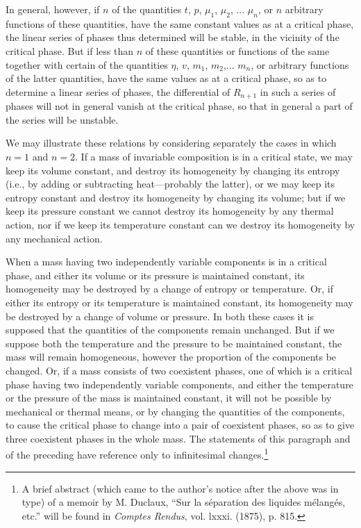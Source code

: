 \documentclass[12pt]{memoir}
\begin{document}
In general, however, if $n$ of the quantities $t$, $p$, $\mu_1$, $\mu_2$, ... $\mu_n$, or $n$ arbitrary functions of these quantities, have the same constant values as at a critical phase, the linear series of phases thus determined will be stable, in the vicinity of the critical phase. But if less than $n$ of these quantities or functions of the same together with certain of the quantities $\eta$, $v$, $m_1$, $m_2$,... $m_n$, or arbitrary functions of the latter quantities, have the same values as at a critical phase, so as to determine a linear series of phases, the differential of $R_{n+1}$ in such a series of phases will not in general vanish at the critical phase, so that in general a part of the series will be unstable.


We may illustrate these relations by considering separately the cases in which $n = 1$ and $n = 2$. If a mass of invariable composition is in a critical state, we may keep its volume constant, and destroy its homogeneity by changing its entropy (i.e., by adding or subtracting heat---probably the latter), or we may keep its entropy constant and destroy its homogeneity by changing its volume; but if we keep its pressure constant we cannot destroy its homogeneity by any thermal action, nor if we keep its temperature constant can we destroy its homogeneity by any mechanical action.


When a mass having two independently variable components is in a critical phase, and either its volume or its pressure is maintained constant, its homogeneity may be destroyed by a change of entropy or temperature. Or, if either its entropy or its temperature is maintained constant, its homogeneity may be destroyed by a change of volume or pressure. In both these cases it is supposed that the quantities of the components remain unchanged. But if we suppose both the temperature and the pressure to be maintained constant, the mass will remain homogeneous, however the proportion of the components be changed. Or, if a mass consists of two coexistent phases, one of which is a critical phase having two independently variable components, and either the temperature or the pressure of the mass is maintained constant, it will not be possible by mechanical or thermal means, or by changing the quantities of the components, to cause the critical phase to change into a pair of coexistent phases, so as to give three coexistent phases in the whole mass. The statements of this paragraph and of the preceding have reference only to infinitesimal changes.\footnote{A brief abstract (which came to the author's notice after the above was in type) of a memoir by M. Duclaux,  ``Sur la séparation des liquides mélangés, etc.'' will be found in \textit{Comptes Rendus}, vol. lxxxi. (1875), p. 815.}
\end{document}
